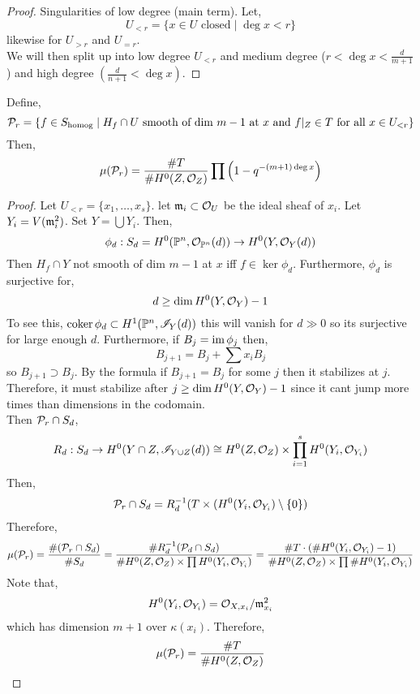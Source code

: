 \documentclass[12pt]{article}
\begin{document}
\begin{proof}
Singularities of low degree (main term). Let,
\[ U_{<r} = \{ x \in U \text{ closed} \mid \deg{x} < r \} \]
likewise for $U_{>r}$ and $U_{=r}$. 
\bigskip\\
We will then split up into low degree $U_{<r}$ and medium degree ($r < \deg{x} < \frac{d}{m+1}$) and high degree $(\frac{d}{n+1} < \deg{x})$. 
\end{proof} 


 
\begin{lemma}
Define,
\[ \mathcal{P}_r = \{ f \in S_{\text{homog}} \mid H_f \cap U \text{ smooth of dim } m - 1 \text{ at } x \text{ and } f|_Z \in T \text{ for all } x \in U_{<r} \} \]
Then,
\[ \mu(\mathcal{P}_r) = \frac{\# T}{\# H^0(Z, \mathcal{O}_{Z})} \prod \left( 1 - q^{-(m+1) \deg{x}} \right) \]
\end{lemma} 

\begin{proof}
Let $U_{<r} = \{x_1, \dots, x_s \}$. let $\mathfrak{m}_i \subset \mathcal{O}_{U}$ be the ideal sheaf of $x_i$. Let $Y_i = V(\mathfrak{m}_i^2)$. Set $Y = \bigcup Y_i$. Then,
\[ \phi_d : S_d = H^0(\mathbb{P}^n, \mathcal{O}_{\mathbb{P}^n}(d)) \to H^0(Y, \mathcal{O}_{Y}(d)) \]
Then $H_f \cap Y$ not smooth of dim $m - 1$ at $x$ iff $f \in \ker{\phi_d}$. Furthermore, $\phi_d$ is surjective for, 
\[ d \ge \dim H^0(Y, \mathcal{O}_{Y}) - 1 \]
To see this, $\operatorname{\mathrm{coker}}{\phi_d} \subset H^1(\mathbb{P}^n, \mathscr{I}_Y(d))$ this will vanish for $d \gg 0$ so its surjective for large enough $d$. Furthermore, if $B_j = \operatorname{\mathrm{im}}{\phi_j}$ then,
\[ B_{j + 1} = B_j + \sum x_i B_j \]
so $B_{j+1} \supset B_j$. By the formula if $B_{j+1} = B_j$ for some $j$ then it stabilizes at $j$. Therefore, it must stabilize after $j \ge \dim{H^0(Y, \mathcal{O}_{Y}) }- 1$ since it cant jump more times than dimensions in the codomain.
\bigskip\\
Then $\mathcal{P}_r \cap S_d$,
\[ R_d : S_d \to H^0(Y \cap Z, \mathscr{I}_{Y \cup Z}(d)) \cong H^0(Z, \mathcal{O}_{Z}) \times \prod^s_{i = 1} H^0(Y_i, \mathcal{O}_{Y_i}) \]
Then,
\[ \mathcal{P}_r \cap S_d = R_d^{-1}(T \times (H^0(Y_i, \mathcal{O}_{Y_i}) \setminus \{ 0 \}) \]
Therefore,
\[ \mu(\mathcal{P}_r) = \frac{\# (\mathcal{P}_r \cap S_d)}{\# S_d} = \frac{\# R_d^{-1}(\mathcal{P}_d \cap S_d)}{\# H^0(Z, \mathcal{O}_{Z}) \times \prod H^0(Y_i, \mathcal{O}_{Y_i})} = \frac{\# T \cdot (\# H^0(Y_i, \mathcal{O}_{Y_i}) - 1)}{\# H^0(Z, \mathcal{O}_{Z}) \times \prod \# H^0(Y_i, \mathcal{O}_{Y_i})} \]
Note that,
\[ H^0(Y_i, \mathcal{O}_{Y_i}) = \mathcal{O}_{X, x_i} / \mathfrak{m}_{x_i}^2 \]
which has dimension $m + 1$ over $\kappa(x_i)$. Therefore,
\[ \mu(\mathcal{P}_r) = \frac{\# T}{\# H^0(Z, \mathcal{O}_{Z})} \]
\end{proof}
\end{document}
